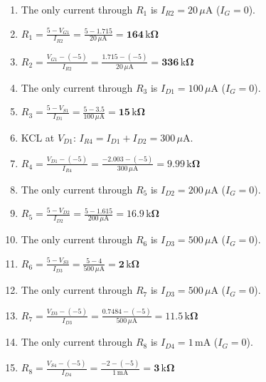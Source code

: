 \documentclass[11pt]{article}
\begin{document}
\begin{enumerate}[leftmargin=*,itemsep=3pt]
\item The only current through $R_{1}$ is $I_{R2} = 20\,\mu \mathrm{A}$ ($I_G = 0$).
\item $\displaystyle R_{1} = \frac{5 - V_{G1}}{I_{R2}} = \frac{5 - 1.715}{20\,\mu \mathrm{A}} = \mathbf{164\,\mathrm{k}\Omega}$
\item $\displaystyle R_{2} = \frac{V_{G1} - (-5)}{I_{R2}} = \frac{1.715 - (-5)}{20\,\mu \mathrm{A}} = \mathbf{336\,\mathrm{k}\Omega}$
\item The only current through $R_{3}$ is $I_{D1} = 100\,\mu \mathrm{A}$ ($I_G = 0$).
\item $\displaystyle R_{3} = \frac{5 - V_{S1}}{I_{D1}} = \frac{5 - 3.5}{100\,\mu \mathrm{A}} = \mathbf{15\,\mathrm{k}\Omega}$
\item KCL at $V_{D1}$: $I_{R4} = I_{D1} + I_{D2} = 300\,\mu \mathrm{A}$.
\item $\displaystyle R_{4} = \frac{V_{D1} - (-5)}{I_{R4}} = \frac{-2.003 - (-5)}{300\,\mu \mathrm{A}} = \mathbf{9.99\,\mathrm{k}\Omega}$
\item The only current through $R_{5}$ is $I_{D2} = 200\,\mu \mathrm{A}$ ($I_G = 0$).
\item $\displaystyle R_{5} = \frac{5 - V_{D2}}{I_{D2}} = \frac{5 - 1.615}{200\,\mu \mathrm{A}} = \mathbf{16.9\,\mathrm{k}\Omega}$
\item The only current through $R_{6}$ is $I_{D3} = 500\,\mu \mathrm{A}$ ($I_G = 0$).
\item $\displaystyle R_{6} = \frac{5 - V_{S3}}{I_{D3}} = \frac{5 - 4}{500\,\mu \mathrm{A}} = \mathbf{2\,\mathrm{k}\Omega}$
\item The only current through $R_{7}$ is $I_{D3} = 500\,\mu \mathrm{A}$ ($I_G = 0$).
\item $\displaystyle R_{7} = \frac{V_{D3} - (-5)}{I_{D3}} = \frac{0.7484 - (-5)}{500\,\mu \mathrm{A}} = \mathbf{11.5\,\mathrm{k}\Omega}$
\item The only current through $R_{8}$ is $I_{D4} = 1\,\mathrm{m}\mathrm{A}$ ($I_G = 0$).
\item $\displaystyle R_{8} = \frac{V_{S4} - (-5)}{I_{D4}} = \frac{-2 - (-5)}{1\,\mathrm{m}\mathrm{A}} = \mathbf{3\,\mathrm{k}\Omega}$
\end{enumerate}
\end{document}
